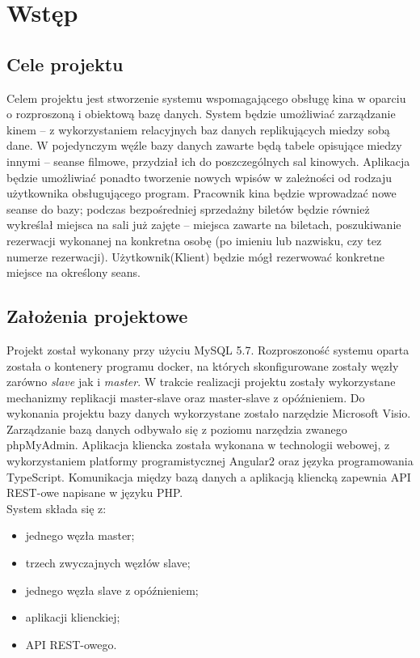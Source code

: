 \chapter{Wstęp}

\section{Cele projektu}
Celem projektu jest stworzenie systemu wspomagającego obsługę kina w oparciu o rozproszoną i obiektową bazę danych. System będzie umożliwiać zarządzanie kinem – z wykorzystaniem relacyjnych baz danych replikujących miedzy sobą dane. W pojedynczym węźle bazy danych zawarte będą tabele opisujące miedzy innymi – seanse filmowe, przydział ich do poszczególnych sal kinowych. Aplikacja będzie umożliwiać ponadto tworzenie nowych wpisów w zależności od rodzaju użytkownika obsługującego program. Pracownik kina będzie wprowadzać nowe seanse do bazy; podczas bezpośredniej sprzedażny biletów będzie również wykreślał miejsca
na sali już zajęte – miejsca zawarte na biletach, poszukiwanie rezerwacji wykonanej na konkretna osobę (po imieniu lub nazwisku, czy tez numerze rezerwacji). Użytkownik(Klient) będzie mógł rezerwować konkretne miejsce na określony seans.

\section{Założenia projektowe}
Projekt został wykonany przy użyciu MySQL 5.7. Rozproszoność systemu oparta została o kontenery programu docker, na których skonfigurowane zostały węzły zarówno \textit{slave} jak i \textit{master}. W trakcie realizacji projektu zostały wykorzystane mechanizmy replikacji master-slave oraz master-slave z opóźnieniem. Do wykonania projektu bazy danych wykorzystane zostało narzędzie Microsoft Visio. Zarządzanie bazą danych odbywało się z poziomu narzędzia zwanego phpMyAdmin. Aplikacja kliencka została wykonana w technologii webowej, z wykorzystaniem platformy programistycznej Angular2 oraz języka programowania TypeScript. Komunikacja między bazą danych a aplikacją kliencką zapewnia API REST-owe napisane w języku PHP. \\

System składa się z:
\begin{itemize}
	\item jednego węzła master;
	\item trzech zwyczajnych węzłów slave;
	\item jednego węzła slave z opóźnieniem;
	\item aplikacji klienckiej;
	\item API REST-owego.
\end{itemize}


